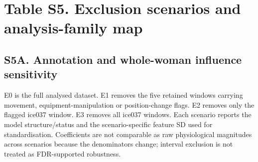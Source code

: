 \documentclass[10pt]{article}
\begin{document}
\section*{Table S5. Exclusion scenarios and analysis-family map}\label{tab:s5_sensitivity}
\subsection*{S5A. Annotation and whole-woman influence sensitivity}
E0 is the full analysed dataset. E1 removes the five retained windows carrying movement, equipment-manipulation or position-change flags. E2 removes only the flagged ice037 window. E3 removes all ice037 windows. Each scenario reports the model structure/status and the scenario-specific feature SD used for standardisation. Coefficients are not comparable as raw physiological magnitudes across scenarios because the denominators change; interval exclusion is not treated as FDR-supported robustness.
\end{document}
